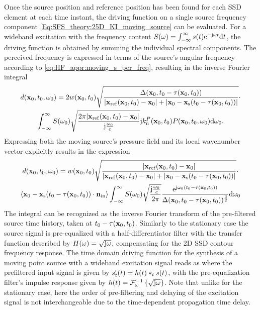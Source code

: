 Once the source position and reference position has been found for each SSD element at each time instant, the driving function on a single source frequency component \eqref{Eq:SFS_theory:25D_KI_moving_source} can be evaluated.
For a wideband excitation with the frequency content $S(\omega) = \int_{-\infty}^{\infty} s(t) \mathrm{e}^{-\mathrm{j} \omega t} \mathrm{d} t$, the driving function is obtained by summing the individual spectral components.
The perceived frequency is expressed in terms of the source's angular frequency according to \eqref{eq:HF_appr:moving_s_per_freq}, resulting in the inverse Fourier integral
\begin{multline}
\small
d(\vxo,t_0,\omega_0) =2 w(\vxo,t_0) 
\sqrt{\frac{\Delta(\vxo,t_0-\tau(\vxo,t_0))}{|\vxref(\vxo,t_0)-\vxo|+|\vxo - \vxs(t_0-\tau(\vxo,t_0))|}}
\cdot \\ %
 \int_{-\infty}^{\infty} S(\omega_0)
\sqrt{\frac{2\pi |\vxref(\vxo,t_0)-\vxo|}{\ti \frac{\omega_0}{c} }}
\ti k_{\mathrm{n}}^P(\vxo,t_0) P(\vxo,t_0,\omega_0) \td \omega_0.
\end{multline}
Expressing both the moving source's pressure field and its local wavenumber vector explicitly results in the expression
\begin{multline}
\small
d(\vxo,t_0,\omega_0) = w(\vxo,t_0) 
\sqrt{\frac{|\vxref(\vxo,t_0)-\vxo| }{|\vxref(\vxo,t_0)-\vxo|+|\vxo - \vxs(t_0-\tau(\vxo,t_0))|}}
\cdot \\ %
\left< \vxo -\vxs(t_0-\tau(\vxo,t_0)) \cdot \vni \right>
\int_{-\infty}^{\infty} S(\omega_0)
\sqrt{\frac{\ti \frac{\omega_0}{c}}{2\pi}}
\frac{\te^{\ti \omega_0\left( t_0 - \tau( \vxo,t_0 )\right)}}{\Delta(\vxo,t_0-\tau( \vxo, t_0 ))^{\frac{3}{2}}}
 \td \omega_0
\end{multline}
The integral can be recognized as the inverse Fourier transform of the pre-filtered source time history, taken at $t_0 - \tau( \mathbf{x}_0,t_0 )$.
Similarly to the stationary case the source signal is pre-equalized with a half-differentiator filter with the transfer function described by $H(\omega) = \sqrt{\mathrm{j} \omega}$, compensating for the 2D SSD contour frequency response.
The time domain driving function for the synthesis of a moving point source with a wideband excitation signal reads as
where the prefiltered input signal is given by $ s^{\nshortmid}_t(t) = h(t) \ast_{t} s(t)$, with the pre-equalization filter's impulse response given by $h(t) = \mathcal{F}^{-1}_{\omega}\left\{ \sqrt{\mathrm{j} \omega} \right\}$.
Note that unlike for the stationary case, here the order of pre-filtering and delaying of the excitation signal is not interchangeable due to the time-dependent propagation time delay.

